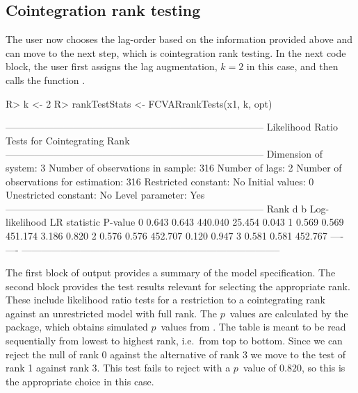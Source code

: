 \documentclass[article]{jss}
\newcommand{\fct}[1]{\code{#1()}}
\begin{document}
\subsection{Cointegration rank testing}

The user now chooses the lag-order based on the information provided above and can move to the next step, which is cointegration rank testing. 
In the next code block, the user first assigns the lag augmentation, $k = 2$ in this case, and then calls the function \fct{FCVARrankTests}. 



\begin{CodeChunk} 
\begin{CodeInput}
R> k <- 2
R> rankTestStats <- FCVARrankTests(x1, k, opt)
\end{CodeInput}
\begin{CodeOutput}
--------------------------------------------------------------------------------
             Likelihood Ratio Tests for Cointegrating Rank                               
--------------------------------------------------------------------------------
Dimension of system:       3     Number of observations in sample:          316 
Number of lags:            2     Number of observations for estimation:     316 
Restricted constant:      No     Initial values:                              0
Unestricted constant:     No     Level parameter:                           Yes
--------------------------------------------------------------------------------
Rank     d      b     Log-likelihood   LR statistic   P-value
 0     0.643  0.643          440.040         25.454     0.043
 1     0.569  0.569          451.174          3.186     0.820
 2     0.576  0.576          452.707          0.120     0.947
 3     0.581  0.581          452.767           ----      ----
--------------------------------------------------------------------------------
\end{CodeOutput}
\end{CodeChunk} 


The first block of output provides a summary of the model specification. The second block provides the test results relevant for selecting the appropriate rank. 
These include likelihood ratio tests for a restriction to a cointegrating rank against an unrestricted model with full rank. 
% 
The $p$~values are calculated by the  package, which obtains simulated $p$~values from \cite{mackinnon2014numerical}. 
% 
The table is meant to be read sequentially from lowest to highest rank, i.e.\ from top to bottom. Since we can reject the null of rank 0 against the alternative of rank 3 we move to the test of rank 1 against rank 3. This test fails to reject with a $p$~value of $0.820$, so this is the appropriate choice in this case.
\end{document}
